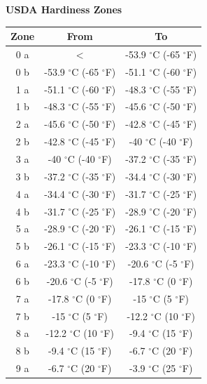 \documentclass[10pt]{extarticle}
\begin{document}
\begin{center}
\textbf{USDA Hardiness Zones}\\
\begin{tabular}{|c|c|c|}
\hline 
Zone & 	From &	To
\\
\hline 
0 a & $<$ &  -53.9 $^{\circ}$C (-65 $^{\circ}$F) 
\\
\hline 
0 b & -53.9 $^{\circ}$C (-65 $^{\circ}$F) &	-51.1 $^{\circ}$C (-60 $^{\circ}$F)
\\
\hline 
1  a &	-51.1 $^{\circ}$C (-60 $^{\circ}$F) &	-48.3 $^{\circ}$C (-55 $^{\circ}$F)
 \\
\hline 
1  b &-48.3 $^{\circ}$C (-55 $^{\circ}$F) &	-45.6 $^{\circ}$C (-50 $^{\circ}$F)
\\
\hline 
2 a &	-45.6 $^{\circ}$C (-50 $^{\circ}$F)& 	-42.8 $^{\circ}$C (-45 $^{\circ}$F)
\\
\hline 
2 b & 	-42.8 $^{\circ}$C (-45 $^{\circ}$F) &	-40 $^{\circ}$C (-40 $^{\circ}$F)
\\
\hline 
3 a &	-40 $^{\circ}$C (-40 $^{\circ}$F) &	-37.2 $^{\circ}$C (-35 $^{\circ}$F)
\\
\hline 
3 b &	-37.2 $^{\circ}$C (-35 $^{\circ}$F) &	-34.4 $^{\circ}$C (-30 $^{\circ}$F)
\\
\hline 
4 a &	-34.4 $^{\circ}$C (-30 $^{\circ}$F) &	-31.7 $^{\circ}$C (-25 $^{\circ}$F)
\\
\hline 
4 b &	-31.7 $^{\circ}$C (-25 $^{\circ}$F) &	-28.9 $^{\circ}$C (-20 $^{\circ}$F)
\\
\hline 
5 a &	-28.9 $^{\circ}$C (-20 $^{\circ}$F) &	-26.1 $^{\circ}$C (-15 $^{\circ}$F)
\\
\hline 
5 b &	-26.1 $^{\circ}$C (-15 $^{\circ}$F) &	-23.3 $^{\circ}$C (-10 $^{\circ}$F)
\\
\hline 
6 a &	-23.3 $^{\circ}$C (-10 $^{\circ}$F) &	-20.6 $^{\circ}$C (-5 $^{\circ}$F)
\\
\hline 
6 b &	-20.6 $^{\circ}$C (-5 $^{\circ}$F) &	-17.8 $^{\circ}$C (0 $^{\circ}$F)
\\
\hline 
7 a &	-17.8 $^{\circ}$C (0 $^{\circ}$F) &	-15 $^{\circ}$C (5 $^{\circ}$F)
\\
\hline 
7 b &	-15 $^{\circ}$C (5 $^{\circ}$F) &	-12.2 $^{\circ}$C (10 $^{\circ}$F)
\\
\hline 
8 a &	-12.2 $^{\circ}$C (10 $^{\circ}$F) &	-9.4 $^{\circ}$C (15 $^{\circ}$F)
\\
\hline 
8 b &	-9.4 $^{\circ}$C (15 $^{\circ}$F) &	-6.7 $^{\circ}$C (20 $^{\circ}$F)
\\
\hline 
9 a &	-6.7 $^{\circ}$C (20 $^{\circ}$F) &	-3.9 $^{\circ}$C (25 $^{\circ}$F) \\

\end{tabular}
\end{center}
\end{document}
